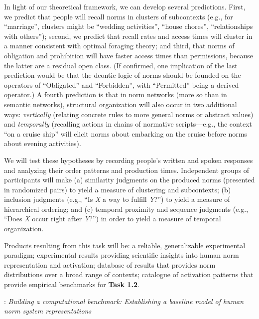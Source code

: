 \documentclass[12pt]{article}
\begin{document}

In light of our theoretical framework, we can develop several
predictions. First, we predict that people will recall norms in
clusters of subcontexts (e.g., for ``marriage'', clusters might be
``wedding activities'', ``house chores'', ``relationships with
others''); second, we predict that recall rates and access times will
cluster in a manner consistent with optimal foraging theory; and
third, that norms of obligation and prohibition will have faster
access times than permissions, because the latter are a residual open
class.  (If confirmed, one implication of the last prediction would be
that the deontic logic of norms should be founded on the operators of
``Obligated'' and ``Forbidden'', with ``Permitted'' being a derived
operator.)  A fourth prediction is that in norm networks (more so than
in semantic networks), structural organization will also occur in two
additional ways: {\em vertically} (relating concrete rules to more
general norms or abstract values) and {\em temporally} (recalling
actions in chains of normative scripts---e.g., the context ``on a
cruise ship'' will elicit norms about embarking on the cruise before
norms about evening activities).

We will test these hypotheses by recording people's written and spoken
responses and analyzing their order patterns and production times.
Independent groups of participants will make (a) similarity judgments
on the produced norms (presented in randomized pairs) to yield a
measure of clustering and subcontexts; (b) inclusion judgments (e.g.,
``Is {\em X} a way to fulfill {\em Y}?'') to yield a measure of
hierarchical ordering; and (c) temporal proximity and sequence
judgments (e.g., ``Does {\em X} occur right after {\em Y}?'') in order
to yield a measure of temporal organization.

Products resulting from this task will be: a reliable, generalizable
experimental paradigm; experimental results providing scientific
insights into human norm representation and activation; database of
results that provides norm distributions over a broad range of
contexts; catalogue of activation patterns that provide empirical
benchmarks for {\bf Task 1.2}.

\vskip 0.1in
: {\em Building a computational benchmark:
  Establishing a baseline model of human norm system representations}
\vspace{1mm}
\end{document}
